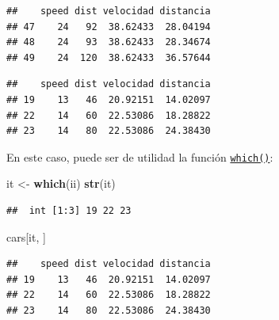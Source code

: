 \documentclass[
]{book}
\newenvironment{Shaded}{\begin{snugshade}}{\end{snugshade}}
\newcommand{\CommentTok}[1]{\textcolor[rgb]{0.56,0.35,0.01}{\textit{#1}}}
\newcommand{\DecValTok}[1]{\textcolor[rgb]{0.00,0.00,0.81}{#1}}
\newcommand{\FunctionTok}[1]{\textcolor[rgb]{0.13,0.29,0.53}{\textbf{#1}}}
\newcommand{\NormalTok}[1]{#1}
\newcommand{\OtherTok}[1]{\textcolor[rgb]{0.56,0.35,0.01}{#1}}
\newcommand{\SpecialCharTok}[1]{\textcolor[rgb]{0.81,0.36,0.00}{\textbf{#1}}}
\theoremstyle{break}
\theoremstyle{nonumberplain}
\renewcommand{\CommentTok}[1]{\textcolor[rgb]{0.41,0.41,0.41}{\texttt{#1}}}
\begin{document}
\begin{verbatim}
##    speed dist velocidad distancia
## 47    24   92  38.62433  28.04194
## 48    24   93  38.62433  28.34674
## 49    24  120  38.62433  36.57644
\end{verbatim}

\begin{Shaded}
\end{Shaded}

\begin{verbatim}
##    speed dist velocidad distancia
## 19    13   46  20.92151  14.02097
## 22    14   60  22.53086  18.28822
## 23    14   80  22.53086  24.38430
\end{verbatim}

En este caso, puede ser de utilidad la función \href{https://www.rdocumentation.org/packages/base/versions/3.6.1/topics/which}{\texttt{which()}}:

\begin{Shaded}
\begin{Highlighting}[]
\NormalTok{it }\OtherTok{\textless{}{-}} \FunctionTok{which}\NormalTok{(ii)}
\FunctionTok{str}\NormalTok{(it)}
\end{Highlighting}
\end{Shaded}

\begin{verbatim}
##  int [1:3] 19 22 23
\end{verbatim}

\begin{Shaded}
\begin{Highlighting}[]
\NormalTok{cars[it, ]}
\end{Highlighting}
\end{Shaded}

\begin{verbatim}
##    speed dist velocidad distancia
## 19    13   46  20.92151  14.02097
## 22    14   60  22.53086  18.28822
## 23    14   80  22.53086  24.38430
\end{verbatim}
\end{document}
